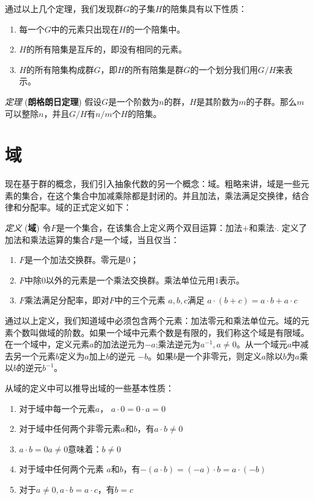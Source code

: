 \documentclass[10pt,a4paper,UTF8]{article}
\begin{document}
通过以上几个定理，我们发现群\(G\)的子集\(H\)的陪集具有以下性质：
\begin{enumerate}
\item 每一个\(G\)中的元素只出现在\(H\)的一个陪集中。
\item \(H\)的所有陪集是互斥的，即没有相同的元素。
\item \(H\)的所有陪集构成群\(G\)，即\(H\)的所有陪集是群\(G\)的一个划分我们用\(G/H\)来表示。
\end{enumerate}

\emph{定理} (\textbf{朗格朗日定理}) 假设\(G\)是一个阶数为\(n\)的群，\(H\)是其阶数为\(m\)的子群。那么\(m\)可以整除\(n\)，并且\(G/H\)有\(n/m\)个\(H\)的陪集。

\section{域}
\label{sec:org1cfe7b5}


现在基于群的概念，我们引入抽象代数的另一个概念：域。粗略来讲，域是一些元素的集合，在这个集合中加减乘除都是封闭的。并且加法，乘法满足交换律，结合律和分配率。域的正式定义如下：

\emph{定义} (\textbf{域}) 令\(F\)是一个集合，在该集合上定义两个双目运算：加法\(+\)和乘法\(\cdot\). 定义了加法和乘法运算的集合\(F\)是一个域，当且仅当：
\begin{enumerate}
\item \(F\)是一个加法交换群。零元是\(0\)；
\item \(F\)中除\(0\)以外的元素是一个乘法交换群。乘法单位元用\(1\)表示。
\item \(F\)乘法满足分配率，即对\(F\)中的三个元素 \(a,b,c\)满足 \(a\cdot ( b+c) = a\cdot b + a\cdot c\)
\end{enumerate}

通过以上定义，我们知道域中必须包含两个元素：加法零元和乘法单位元。域的元素个数叫做域的阶数。如果一个域中元素个数是有限的，我们称这个域是有限域。在一个域中，定义元素\(a\)的加法逆元为\(-a\);乘法逆元为\(a^{-1},a\neq 0\)。从一个域元\(a\)中减去另一个元素\(b\)定义为\(a\)加上\(b\)的逆元 \(-b\)。如果\(b\)是一个非零元，则定义\(a\)除以\(b\)为\(a\)乘以\(b\)的逆元\(b^{-1}\)。

从域的定义中可以推导出域的一些基本性质：
\begin{enumerate}
\item 对于域中每一个元素\(a\)， \(a\cdot 0 = 0\cdot a = 0\)
\item 对于域中任何两个非零元素\(a\)和\(b\)，有\(a\cdot b \neq 0\)
\item \(a\cdot b = 0 a\neq 0\)意味着：\(b\neq 0\)
\item 对于域中任何两个元素 \(a\)和\(b\)，有\(-(a\cdot b) = (-a)\cdot b = a\cdot (-b)\)
\item 对于\(a\neq 0,a\cdot b = a\cdot c\)，有\(b = c\)
\end{enumerate}
\end{document}
